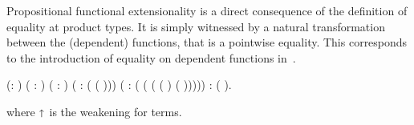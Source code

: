
\begin{coqdoccode}
\coqdocemptyline
\coqdocemptyline
\end{coqdoccode}


  Propositional functional extensionality is a direct consequence of the definition
  of equality at product types. It is simply witnessed by a natural transformation
  between the (dependent) functions, that is a pointwise equality. This corresponds 
  to the introduction of equality on dependent functions in~\cite{DBLP:conf/popl/LicataH12}.
\begin{coqdoccode}
\coqdocemptyline
\coqdocemptyline
\coqdocnoindent
{}  (: ) ( :  )\coqdoceol
\coqdocindent{5.50em}
( :  ) (  :  ( (\coqdocdefinition{$\Lambda$} )))\coqdoceol
\coqdocindent{5.50em}
( :  ( (\coqdocdefinition{$\Lambda$} ( (  \coqdocnotation{$\star$}  ) (  \coqdocnotation{$\star$}  )))))\coqdoceol
\coqdocnoindent
:  (  ).\coqdoceol
\coqdocemptyline
\end{coqdoccode}
 \noindent where $\shortuparrow$ is the weakening for terms. 
\begin{coqdoccode}
\end{coqdoccode}
